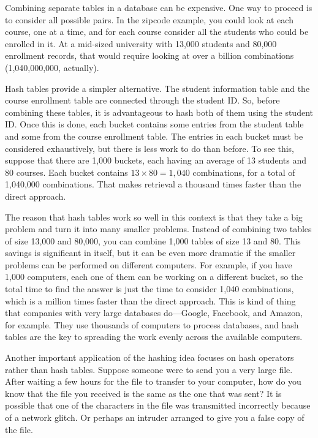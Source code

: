 Combining separate tables in a database can be expensive.
One way to proceed is to consider all possible pairs.
In the zipcode example, you could look at each course,
one at a time, and for each course consider
all the students who could be enrolled in it.
At a mid-sized university with 13,000 students
and 80,000 enrollment records, that would require
looking at over a billion combinations (1,040,000,000, actually).

Hash tables provide a simpler alternative. The student information table
and the course enrollment table are connected through the student ID.
So, before combining these tables, it is advantageous to hash both of them
using the student ID. Once this is done, each bucket contains some entries
from the student table and some from the course enrollment table. The entries
in each bucket must be considered exhaustively, but there is less work to do
than before.
To see this, suppose that there are 1,000 buckets,
each having an average of 13 students and 80 courses. Each bucket
contains $13 \times 80 =1,040$ combinations,
for a total of 1,040,000 combinations.
That makes retrieval a thousand times faster than the direct approach.

The reason that hash tables work so well in this context is that they take
a big problem and turn it into many smaller problems. Instead
of combining two tables of size 13,000 and 80,000, you can combine 1,000
tables of size 13 and 80. This savings is significant in itself, but it can
be even more dramatic if the smaller problems can be performed on different
computers. For example, if you have 1,000 computers, each one of them can be
working on a different bucket, so the total time to find the answer is
just the time to consider 1,040 combinations, which is a million times
faster than the direct approach.
This is kind of thing that companies with very large databases do---Google, Facebook, and Amazon, for example.
They use thousands of computers to process databases, and
hash tables are the key to spreading
the work evenly across the available computers.

Another important application of the hashing idea focuses on hash operators
rather than hash tables.
Suppose someone were to send you a very large file.
After waiting a few hours
for the file to transfer to your computer, how do you know that the file
you received is the same as the one that was sent?
It is possible that one of the characters
in the file was transmitted incorrectly because of a network glitch.
Or perhaps an intruder arranged to give you a false copy of the file.

